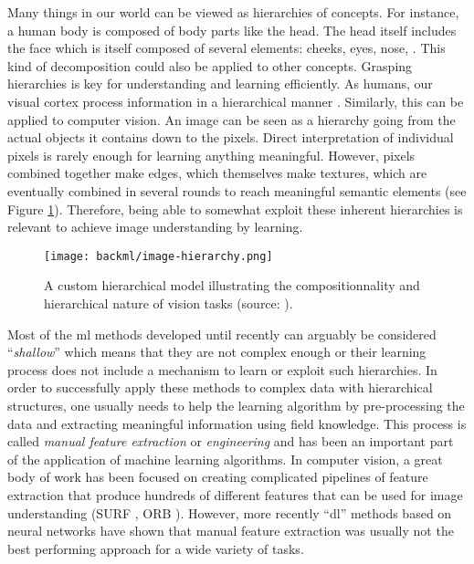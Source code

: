 Many things in our world can be viewed as hierarchies of concepts. For instance,
a human body is composed of body parts like the head. The head itself
includes the face which is itself composed of several elements: cheeks, eyes,
nose, \etc. This kind of decomposition could also be applied to other concepts.
Grasping hierarchies is key for understanding and learning efficiently. As humans,
our visual cortex process information in a hierarchical manner \cite{van1994neural}.
Similarly, this can be applied to computer vision. An image can be seen as a
hierarchy going from the actual objects it contains down to the pixels. Direct
interpretation of individual pixels is rarely enough for learning anything
meaningful. However, pixels combined together make edges, which themselves make
textures, which are eventually combined in several rounds to reach meaningful
semantic elements (see Figure \ref{fig:backml:hierarchy}). Therefore, being able
to somewhat exploit these inherent hierarchies is relevant to achieve image
understanding by learning.

\begin{figure}
  \centering
  \texttt{[image: backml/image-hierarchy.png]}
  \caption{A custom hierarchical model illustrating the compositionnality and hierarchical nature of vision tasks (source: \cite{leonardis2010learning}).}
  \label{fig:backml:hierarchy}
\end{figure}

Most of the \acrlong{ml} methods developed until recently can arguably be considered
``\textit{shallow}'' which means that they are not complex enough or their learning
process does not include a mechanism to learn or exploit such hierarchies. In
order to successfully apply these methods to complex data with hierarchical
structures, one usually needs to help the learning algorithm by pre-processing
the data and extracting meaningful information using field knowledge. This process
is called \textit{manual feature extraction} or \textit{engineering} and has been
an important part of the application of machine learning algorithms. In computer
vision, a great body of work has been focused on creating complicated pipelines
of feature extraction that produce hundreds of different features that can be used
for image understanding (\eg SURF \cite{bay2006surf}, ORB \cite{rublee2011orb}).
However, more recently ``\acrlong{dl}'' methods based on neural networks have
shown that manual feature extraction was usually not the best performing approach
for a wide variety of tasks.

